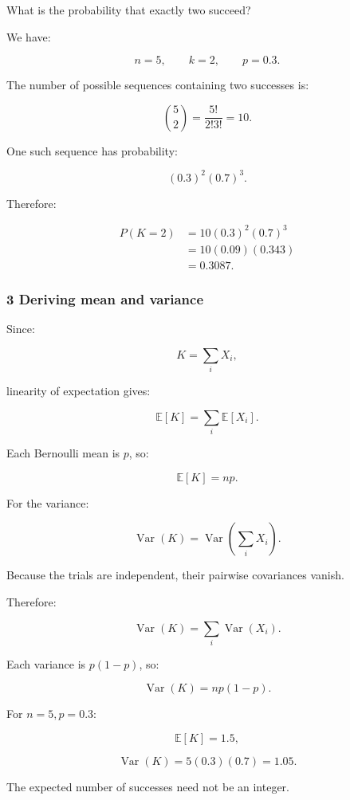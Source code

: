 What is the probability that exactly two succeed?

We have:

\[
 n=5,\qquad k=2,\qquad p=0.3.
\]

The number of possible sequences containing two successes is:

\[
 \binom52=\frac{5!}{2!3!}=10.
\]

One such sequence has probability:

\[
 (0.3)^2(0.7)^3.
\]

Therefore:

\[
 \begin{aligned} P(K=2) &=10(0.3)^2(0.7)^3\\ &=10(0.09)(0.343)\\ &=\boxed{0.3087}. \end{aligned}
\]

\subsubsection{3 Deriving mean and variance}\label{02-foundations-ii-ch023-deriving-mean-and-variance}

\hypertarget{02-foundations-ii-ch023-deriving-mean-and-variance}{}

Since:

\[
 K=\sum_iX_i,
\]

linearity of expectation gives:

\[
 \mathbb E[K]=\sum_i\mathbb E[X_i].
\]

Each Bernoulli mean is \(p\), so:

\[
 \boxed{\mathbb E[K]=np}.
\]

For the variance:

\[
 \operatorname{Var}(K) = \operatorname{Var}\left(\sum_iX_i\right).
\]

Because the trials are independent, their pairwise covariances vanish.

Therefore:

\[
 \operatorname{Var}(K)= \sum_i\operatorname{Var}(X_i).
\]

Each variance is \(p(1-p)\), so:

\[
 \boxed{ \operatorname{Var}(K)=np(1-p) }.
\]

For \(n=5,p=0.3\):

\[
 \mathbb E[K]=1.5,
\]

\[
 \operatorname{Var}(K)=5(0.3)(0.7)=1.05.
\]

The expected number of successes need not be an integer.

